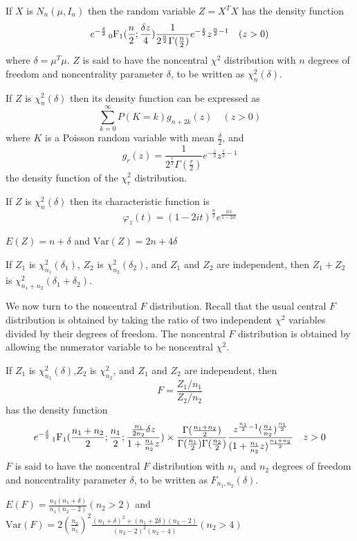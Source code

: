 \begin{theorem}
If $X$ is $N_n(\mu,I_n)$ then the random variable $Z=X^TX$ has the density function
\[e^{-\frac{\delta}{2}}\sideset{_0}{_1}{\operatorname{F}}(\frac{n}{2};\frac{\delta z}{4})\frac{1}{2^{\frac{n}{2}}\Gamma(\frac{n}{2})}e^{-\frac{z}{2}}z^{\frac{n}{2}-1}\quad(z>0)\]
where $\delta=\mu^T\mu$. $Z$ is said to have the noncentral $\chi^2$ distribution with $n$ degrees of freedom and noncentrality parameter $\delta$, to be written as $\chi^2_n(\delta)$.
\end{theorem}
\begin{corollary}
If $Z$ is $\chi^2_n(\delta)$ then its density function can be expressed as 
\[\sum_{k=0}^\infty P(K=k)g_{n+2k}(z)\quad (z>0)\]
where $K$ is a Poisson random variable with mean $\frac{\delta}{2}$, and 
\[g_r(z)=\frac{1}{2^{\frac{r}{2}}\Gamma(\frac{r}{2})}e^{-\frac{z}{2}}z^{\frac{r}{2}-1}\]
 the density function of the $\chi^2_r$ distribution.
\end{corollary}
\begin{theorem}
    If $Z$ is $\chi^2_n(\delta)$ then its characteristic function is 
\[\varphi_z(t)=(1-2it)^{\frac{n}{2}}e^{\frac{it\delta}{1-2it}}\]
\end{theorem}
\begin{corollary}
    $E(Z)=n+\delta$ and $\text{Var}(Z)=2n+4\delta$
\end{corollary}
\begin{corollary}
    If $Z_1$ is $\chi^2_{n_1}(\delta_1)$, $Z_2$ is $\chi^2_{n_2}(\delta_2)$, and $Z_1$ and $Z_2$ are independent, then $Z_1+Z_2$ is $\chi^2_{n_1+n_2}(\delta_1+\delta_2)$.
\end{corollary}
We now turn to the noncentral $F$ distribution. Recall that the usual central $F$ distribution is obtained by taking the ratio of two independent $\chi^2$ variables divided by their degrees of freedom.
The noncentral $F$ distribution is obtained by allowing the numerator variable to be noncentral $\chi^2$.
\begin{theorem}
    If $Z_1$ is $\chi^2_{n_1}(\delta)$,$Z_2$ is $\chi^2_{n_2}$, and $Z_1$ and $Z_2$ are independent, then 
    \[F=\frac{Z_1/n_1}{Z_2/n_2}\]
    has the density function 
    \[e^{-\frac{\delta}{2}}\sideset{_1}{_1}{\operatorname{F}}(\frac{n_1+n_2}{2};\frac{n_1}{2};\frac{\frac{n_1}{2n_2}\delta z}{1+\frac{n_1}{n_2}z})\times\frac{\Gamma(\frac{n_1+n_2}{2})}{\Gamma(\frac{n_1}{2})\Gamma(\frac{n_2}{2})}\frac{z^{\frac{n_1}{2}-1}(\frac{n_1}{n_2})^\frac{n_1}{2}}{(1+\frac{n_1}{n_2}z)^{\frac{n_1+n_2}{2}}}\quad z>0\]
$F$ is said to have the noncentral $F$ distribution with $n_1$ and $n_2$ degrees of freedom and noncentrality parameter $\delta$, to be written as $F_{n_1,n_2}(\delta)$.
\end{theorem}
\begin{corollary}
    $E(F)=\frac{n_2(n_1+\delta)}{n_1(n_2-2)}(n_2>2)$ and $\text{Var}(F)=2(\frac{n_2}{n_1})^2\frac{(n_1+\delta)^2+(n_1+2\delta)(n_2-2)}{(n_2-2)^2(n_2-4)}(n_2>4)$
\end{corollary}
